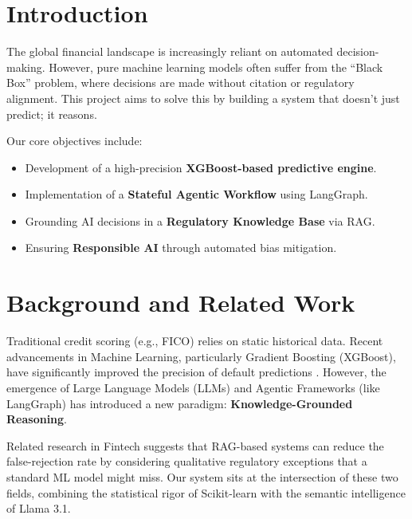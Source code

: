 \documentclass[12pt, a4paper]{article}
\begin{document}
\vspace{1cm}
\tableofcontents
\newpage

\section{Introduction}

The global financial landscape is increasingly reliant on automated decision-making. However, pure machine learning models often suffer from the ``Black Box'' problem, where decisions are made without citation or regulatory alignment. This project aims to solve this by building a system that doesn't just predict; it reasons.

Our core objectives include:
\begin{itemize}[leftmargin=2cm]
  \item Development of a high-precision \textbf{XGBoost-based predictive engine}.
  \item Implementation of a \textbf{Stateful Agentic Workflow} using LangGraph.
  \item Grounding AI decisions in a \textbf{Regulatory Knowledge Base} via RAG.
  \item Ensuring \textbf{Responsible AI} through automated bias mitigation.
\end{itemize}

\section{Background and Related Work}

Traditional credit scoring (e.g., FICO) relies on static historical data. Recent advancements in Machine Learning, particularly Gradient Boosting (XGBoost), have significantly improved the precision of default predictions \cite{xgboost}. However, the emergence of Large Language Models (LLMs) and Agentic Frameworks (like LangGraph) has introduced a new paradigm: \textbf{Knowledge-Grounded Reasoning}.

Related research in Fintech suggests that RAG-based systems can reduce the false-rejection rate by considering qualitative regulatory exceptions that a standard ML model might miss. Our system sits at the intersection of these two fields, combining the statistical rigor of Scikit-learn with the semantic intelligence of Llama 3.1.

\end{document}
